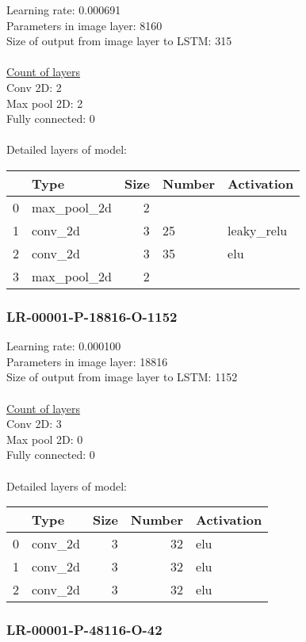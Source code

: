 Learning rate: 0.000691
\\Parameters in image layer: 8160
\\Size of output from image layer to LSTM: 315
\\\\\underline{Count of layers} 
\\Conv 2D:           2\\Max pool 2D:      2\\Fully connected:  0
\\\\Detailed layers of model: \\\begin{tabular}{rlrll}
\hline
    & Type        &   Size & Number   & Activation   \\
\hline
  0 & max\_pool\_2d &      2 &          &              \\
  1 & conv\_2d     &      3 & 25       & leaky\_relu   \\
  2 & conv\_2d     &      3 & 35       & elu          \\
  3 & max\_pool\_2d &      2 &          &              \\
\hline
\end{tabular}\subsubsection*{LR-00001-P-18816-O-1152}
Learning rate: 0.000100
\\Parameters in image layer: 18816
\\Size of output from image layer to LSTM: 1152
\\\\\underline{Count of layers} 
\\Conv 2D:           3\\Max pool 2D:      0\\Fully connected:  0
\\\\Detailed layers of model: \\\begin{tabular}{rlrrl}
\hline
    & Type    &   Size &   Number & Activation   \\
\hline
  0 & conv\_2d &      3 &       32 & elu          \\
  1 & conv\_2d &      3 &       32 & elu          \\
  2 & conv\_2d &      3 &       32 & elu          \\
\hline
\end{tabular}\subsubsection*{LR-00001-P-48116-O-42}
